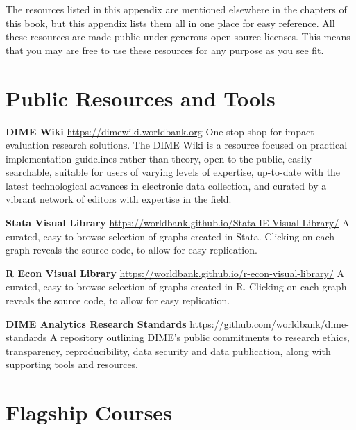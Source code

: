 
\begin{fullwidth}

The resources listed in this appendix are mentioned elsewhere in
the chapters of this book, but this appendix lists them all in one place for easy reference. All
these resources are made public under generous open-source licenses. This means
that you may are free to use these resources for any purpose as you see fit.

\end{fullwidth}


\filbreak
\section{Public Resources and Tools}
\vspace{\baselineskip}

\textbf{DIME Wiki}
\url{https://dimewiki.worldbank.org}
One-stop shop for impact evaluation research solutions. The DIME Wiki is a resource focused on practical implementation guidelines rather than theory, open to the public, easily searchable, suitable for users of varying levels of expertise, up-to-date with the latest technological advances in electronic data collection, and curated by a vibrant network of editors with expertise in the field.

\textbf{Stata Visual Library}
\url{https://worldbank.github.io/Stata-IE-Visual-Library/}
A curated, easy-to-browse selection of graphs created in Stata. Clicking on each graph reveals the source code, to allow for easy replication. 

\textbf{R Econ Visual Library}
\url{https://worldbank.github.io/r-econ-visual-library/}
A curated, easy-to-browse selection of graphs created in R. Clicking on each graph reveals the source code, to allow for easy replication. 

\textbf{DIME Analytics Research Standards}
\url{https://github.com/worldbank/dime-standards}
A repository outlining DIME's public commitments to research ethics, transparency, reproducibility, data security and data publication, along with supporting tools and resources. 


\filbreak
\section{Flagship Courses}

